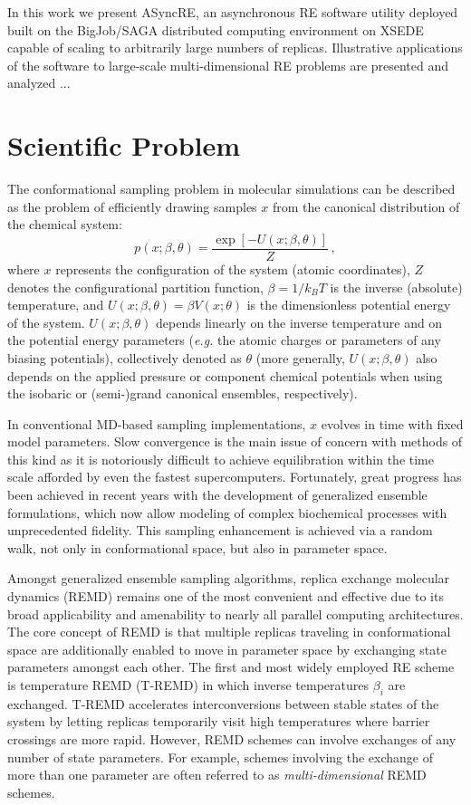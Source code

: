 \documentclass{sig-alternate}
\begin{document}
In this work we present ASyncRE, an asynchronous RE software utility
deployed built on the BigJob/SAGA distributed computing environment on
XSEDE capable of scaling to arbitrarily large numbers of
replicas. Illustrative applications of the software to large-scale
multi-dimensional RE problems are presented and analyzed ...

\section{Scientific Problem}\label{sec:requirements}

The conformational sampling problem in molecular simulations can be described 
as the problem of efficiently drawing samples $x$ from the canonical 
distribution of the chemical system:
\begin{equation}
p(x;\beta,\theta) = \frac{\exp[-U(x;\beta,\theta)]}{Z} \, ,
\end{equation}
where $x$ represents the configuration of the system (atomic coordinates), $Z$ 
denotes the configurational partition function, $\beta=1/k_B T$ is the inverse 
(absolute) temperature, and $U(x;\beta,\theta)=\beta V(x;\theta)$ is the 
dimensionless potential energy of the system.  $U(x;\beta,\theta)$ depends 
linearly on the inverse temperature and on the potential energy parameters 
({\em e.g.} the atomic charges or parameters of any biasing potentials), 
collectively denoted as $\theta$ (more generally, $U(x;\beta,\theta)$ also 
depends on the applied pressure or component chemical potentials when using 
the isobaric or (semi-)grand canonical ensembles, respectively).

In conventional MD-based sampling implementations, $x$ evolves in time with 
fixed model parameters. Slow convergence is the main issue of concern with 
methods of this kind as it is notoriously difficult to achieve equilibration 
within the time scale afforded by even the fastest supercomputers. Fortunately,
great progress has been achieved in recent years with the development of 
generalized ensemble formulations, which now allow modeling of complex 
biochemical processes with unprecedented fidelity. This sampling enhancement is
achieved via a random walk, not only in conformational space, but also in 
parameter space.

Amongst generalized ensemble sampling algorithms, replica exchange molecular
dynamics (REMD) remains one of the most convenient and effective due to its 
broad applicability and amenability to nearly all parallel computing 
architectures. The core concept of REMD is that multiple replicas traveling in
conformational space are additionally enabled to move in parameter space by 
exchanging state parameters amongst each other. The first and most widely 
employed RE scheme is temperature REMD (T-REMD) in which inverse temperatures 
$\beta_i$ are exchanged. T-REMD accelerates interconversions between stable 
states of the system by letting replicas temporarily visit high temperatures 
where barrier crossings are more rapid. However, REMD schemes can involve 
exchanges of any number of state parameters. For example, schemes involving the
exchange of more than one parameter are often referred to as 
\emph{multi-dimensional} REMD schemes.\cite{Mitsutake2010}
\end{document}
